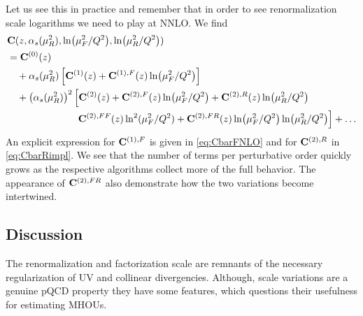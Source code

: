 Let us see this in practice and remember that in order to see renormalization scale logarithms we need to play at NNLO.
We find
\begin{align}
    &\vb C(z,\alpha_s(\mu_R^2),\ln(\mu_F^2/Q^2),\ln(\mu_R^2/Q^2)) \nonumber\\
    &= \vb C^{(0)}(z) \nonumber\\
     &\hspace{10pt} + \alpha_s(\mu_R^2) \left[\vb C^{(1)}(z) + \vb C^{(1),F}(z)\ln(\mu_F^2/Q^2) \right] \nonumber\\
     &\hspace{10pt} + \left(\alpha_s(\mu_R^2)\right)^2 \left[\vb C^{(2)}(z) + \vb C^{(2),F}(z)\ln(\mu_F^2/Q^2) + \vb C^{(2),R}(z)\ln(\mu_R^2/Q^2) \right.\nonumber\\
     &\hspace{70pt} \left. \vb C^{(2),FF}(z)\ln^2(\mu_F^2/Q^2) + \vb C^{(2),FR}(z)\ln(\mu_F^2/Q^2)\ln(\mu_R^2/Q^2) \right] + \ldots
\end{align}
An explicit expression for $\vb C^{(1),F}$ is given in \cref{eq:CbarFNLO} and for $\vb C^{(2),R}$ in \cref{eq:CbarRimpl}.
We see that the number of terms per perturbative order quickly grows as the respective algorithms collect more of the full behavior.
The appearance of $\vb C^{(2),FR}$ also demonstrate how the two variations become intertwined.


\subsection{Discussion}
\label{sec:svdiscussion}
The renormalization and factorization scale are remnants of the necessary regularization of UV and collinear divergencies.
Although, scale variations are a genuine pQCD property they have some features, which questions their usefulness for estimating MHOUs.

